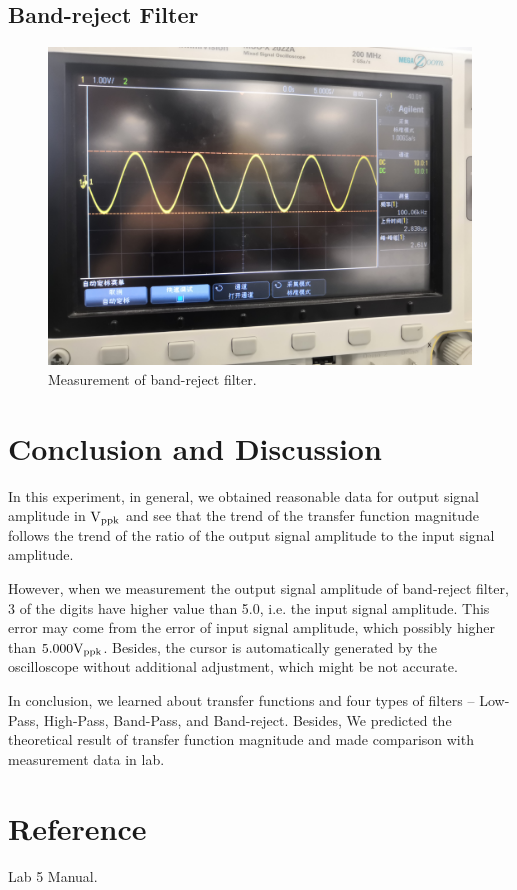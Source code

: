 \documentclass[a4paper]{report}
\begin{document}
\subsection{Band-reject Filter}

\begin{figure}[H]
	\centering
	\includegraphics[width=0.8\linewidth]{12.jpg}
	\caption{Measurement of band-reject filter.}
\end{figure}
\section{Conclusion and Discussion}
In this experiment, in general, we obtained reasonable data for output signal amplitude in $\rm{V_{ppk}}$ and see that the trend of the transfer function magnitude follows the trend of the ratio of the output signal amplitude to the input signal amplitude.

However, when we measurement the output signal amplitude of band-reject filter, 3 of the digits have higher value than 5.0, i.e. the input signal amplitude. This error may come from the error of input signal amplitude, which possibly higher than $5.000\rm{V_{ppk}}$. Besides, the cursor is automatically generated by the oscilloscope without additional adjustment, which might be not accurate.

In conclusion, we learned about transfer functions and four types of filters – Low-Pass, High-Pass, Band-Pass, and Band-reject. Besides, We predicted the theoretical result of transfer function magnitude and made comparison with measurement data in lab.
\section*{Reference}
Lab 5 Manual.
\vspace{2cm}
\end{document}
